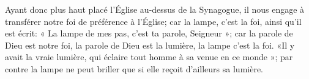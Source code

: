 Ayant donc plus haut placé l'Église au-dessus de la	Synagogue, 
	il nous engage à transférer notre foi de préférence à l'Église; 
	car la lampe, c'est la foi, ainsi qu'il est écrit: 
	« La lampe de mes pas, c'est ta parole, Seigneur »;
	car la parole de Dieu est notre foi,
	la parole de Dieu est la lumière,  la lampe c'est la foi. 
«Il y avait la vraie lumière, qui éclaire tout homme à sa venue en ce monde »; 
	par contre la lampe ne peut briller 
	que si elle reçoit d'ailleurs sa lumière.